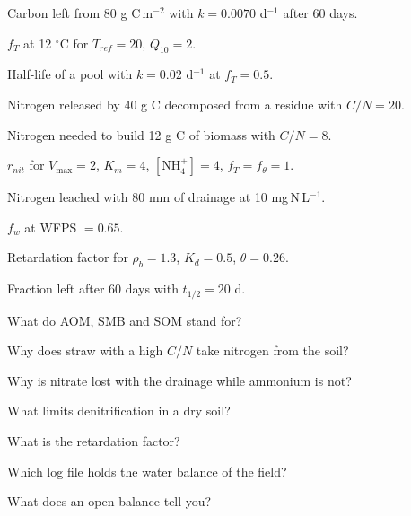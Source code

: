 \begin{exlist}
\item Carbon left from 80 g C\,m$^{-2}$ with $k=0.0070$ d$^{-1}$ after 60 days.
\item $f_T$ at 12 $^\circ$C for $T_{ref}=20$, $Q_{10}=2$.
\item Half-life of a pool with $k=0.02$ d$^{-1}$ at $f_T=0.5$.
\item Nitrogen released by 40 g C decomposed from a residue with $C/N=20$.
\item Nitrogen needed to build 12 g C of biomass with $C/N=8$.
\item $r_{nit}$ for $V_{\max}=2$, $K_m=4$, $[\mathrm{NH_4^+}]=4$, $f_T=f_\theta=1$.
\item Nitrogen leached with 80 mm of drainage at 10 mg\,N\,L$^{-1}$.
\item $f_w$ at WFPS $=0.65$.
\item Retardation factor for $\rho_b=1.3$, $K_d=0.5$, $\theta=0.26$.
\item Fraction left after 60 days with $t_{1/2}=20$ d.
\end{exlist}

\begin{exlist}
\item What do AOM, SMB and SOM stand for?
\item Why does straw with a high $C/N$ take nitrogen from the soil?
\item Why is nitrate lost with the drainage while ammonium is not?
\item What limits denitrification in a dry soil?
\item What is the retardation factor?
\item Which log file holds the water balance of the field?
\item What does an open balance tell you?
\end{exlist}

